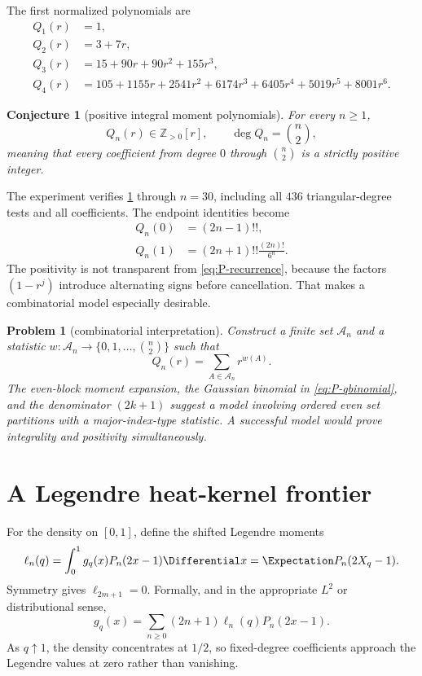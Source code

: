\documentclass[11pt]{article}
\newtheorem{conjecture}[theorem]{Conjecture}
\newtheorem{problem}[theorem]{Problem}
\theoremstyle{definition}
\theoremstyle{remark}
\begin{document}
The first normalized polynomials are
\begin{align*}
 Q_1(r)&=1,\\
 Q_2(r)&=3+7r,\\
 Q_3(r)&=15+90r+90r^2+155r^3,\\
 Q_4(r)&=105+1155r+2541r^2+6174r^3+6405r^4+5019r^5+8001r^6.
\end{align*}

\begin{conjecture}[positive integral moment polynomials]\label{conj:moment-polynomial}
For every $n\ge1$,
\begin{equation}\label{eq:Q-positive}
 Q_n(r)\in\mathbb Z_{>0}[r],
 \qquad
 \deg Q_n=\binom n2,
\end{equation}
meaning that every coefficient from degree $0$ through $\binom n2$ is a strictly positive integer.
\end{conjecture}

The experiment verifies \cref{conj:moment-polynomial} through $n=30$, including all $436$ triangular-degree tests and all coefficients.  The endpoint identities become
\begin{align}
 Q_n(0)&=(2n-1)!!,\label{eq:Q-zero}\\
 Q_n(1)&=(2n+1)!!\frac{(2n)!}{6^n}.
 \label{eq:Q-one}
\end{align}
The positivity is not transparent from \cref{eq:P-recurrence}, because the factors $(1-r^j)$ introduce alternating signs before cancellation.  That makes a combinatorial model especially desirable.

\begin{problem}[combinatorial interpretation]\label{prob:moment-combinatorics}
Construct a finite set $\mathcal A_n$ and a statistic $w:\mathcal A_n\to\{0,1,\ldots,\binom n2\}$ such that
\[
 Q_n(r)=\sum_{A\in\mathcal A_n}r^{w(A)}.
\]
The even-block moment expansion, the Gaussian binomial in \cref{eq:P-qbinomial}, and the denominator $(2k+1)$ suggest a model involving ordered even set partitions with a major-index-type statistic.  A successful model would prove integrality and positivity simultaneously.
\end{problem}

\section{A Legendre heat-kernel frontier}
\label{sec:legendre}

For the density on $[0,1]$, define the shifted Legendre moments
\begin{equation}\label{eq:legendre-moment}
 \ell_n(q)=\int_0^1g_q(x)P_n(2x-1)\Differential x
 =\Expectation P_n(2X_q-1).
\end{equation}
Symmetry gives $\ell_{2m+1}=0$.  Formally, and in the appropriate $L^2$ or distributional sense,
\begin{equation}\label{eq:legendre-expansion}
 g_q(x)=\sum_{n\ge0}(2n+1)\ell_n(q)P_n(2x-1).
\end{equation}
As $q\uparrow1$, the density concentrates at $1/2$, so fixed-degree coefficients approach the Legendre values at zero rather than vanishing.
\end{document}
